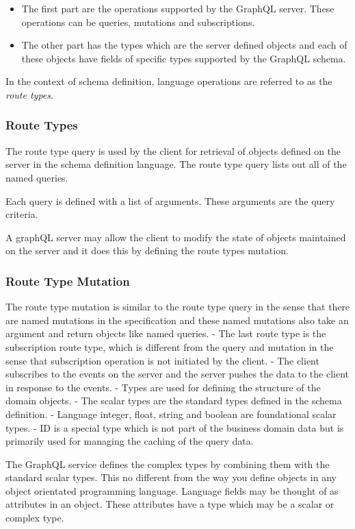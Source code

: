 \documentclass[a4paper, 11pt]{book}
\begin{document}
    \begin{itemize}
        \item The first part are the operations supported by the GraphQL server. These operations can be queries, mutations and subscriptions.
        \item The other part has the types which are the server defined objects and each of these objects have fields of specific types supported by the GraphQL schema.
    \end{itemize}

    In the context of schema definition, language operations are referred to as the \textit{route types}.

    \subsubsection{Route Types}
    The route type query is used by the client for retrieval of objects defined on the server in the schema definition language.
    The route type query lists out all of the named queries.

    Each query is defined with a list of arguments.
    These arguments are the query criteria.

    A graphQL server may allow the client to modify the state of objects maintained on the server and it does this by defining the route types mutation.

    \subsubsection{Route Type Mutation}
    The route type mutation is similar to the route type query in the sense that there are named mutations in the specification and these named mutations also take an argument and return objects like named queries.
    - The last route type is the subscription route type, which is different from the query and mutation in the sense that subscription operation is not initiated by the client.
    - The client subscribes to the events on the server and the server pushes the data to the client in response to the events.
    - Types are used for defining the structure of the domain objects.
    - The scalar types are the standard types defined in the schema definition.
    - Language integer, float, string and boolean are foundational scalar types.
    - ID is a special type which is not part of the business domain data but is primarily used for managing the caching of the query data.

    The GraphQL service defines the complex types by combining them with the standard scalar types.
    This no different from the way you define objects in any object orientated programming language.
    Language fields may be thought of as attributes in an object.
    These attributes have a type which may be a scalar or complex type.
\end{document}
